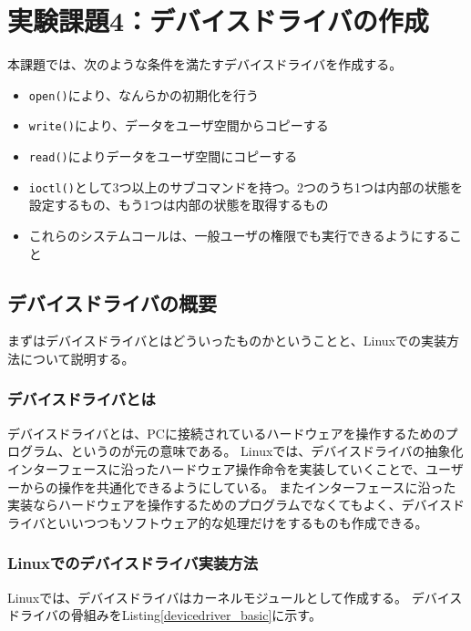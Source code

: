 \documentclass[main]{subfiles}
\begin{document}
\section{実験課題4：デバイスドライバの作成}

本課題では、次のような条件を満たすデバイスドライバを作成する。

\begin{itemize}
 \item \texttt{open()}により、なんらかの初期化を行う
 \item \texttt{write()}により、データをユーザ空間からコピーする
 \item \texttt{read()}によりデータをユーザ空間にコピーする
 \item \texttt{ioctl()}として3つ以上のサブコマンドを持つ。2つのうち1つは内部の状態を設定するもの、もう1つは内部の状態を取得するもの
 \item これらのシステムコールは、一般ユーザの権限でも実行できるようにすること
\end{itemize}

\subsection{デバイスドライバの概要}
\label{intro_devdrv}

まずはデバイスドライバとはどういったものかということと、Linuxでの実装方法について説明する。

\subsubsection{デバイスドライバとは}

デバイスドライバとは、PCに接続されているハードウェアを操作するためのプログラム、というのが元の意味である。
Linuxでは、デバイスドライバの抽象化インターフェースに沿ったハードウェア操作命令を実装していくことで、ユーザーからの操作を共通化できるようにしている。
またインターフェースに沿った実装ならハードウェアを操作するためのプログラムでなくてもよく、デバイスドライバといいつつもソフトウェア的な処理だけをするものも作成できる。

\subsubsection{Linuxでのデバイスドライバ実装方法}

Linuxでは、デバイスドライバはカーネルモジュールとして作成する。
デバイスドライバの骨組みをListing\ref{devicedriver_basic}に示す。
\end{document}
